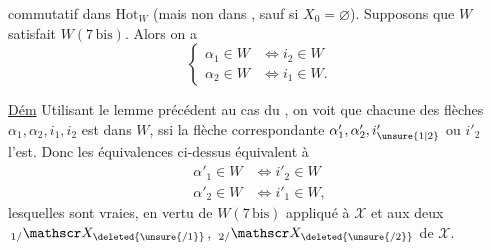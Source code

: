commutatif dans $\mathrm{Hot}_{W}$ (mais non dans , sauf si $X_0=\varnothing$). Supposons que $W$ satisfait $W(7\,\mathrm{bis})$. Alors on a
\[
\left\{\begin{aligned}
\alpha_1\in W&\Longleftrightarrow i_2\in W\\
\alpha_2\in W&\Longleftrightarrow i_1\in W .
\end{aligned}\right.
\]

 \uline{Dém} Utilisant le lemme précédent au cas du , on voit que chacune des flèches $\alpha_1,\alpha_2,i_1,i_2$ est dans $W$, ssi la flèche correspondante $\alpha'_1,\alpha'_2,i'_{\unsure{1|2}}$ ou $i'_2$ l'est. Donc les équivalences ci-dessus équivalent à
\[
\begin{aligned}
\alpha'_1\in W&\Longleftrightarrow i'_2\in W\\
\alpha'_2\in W&\Longleftrightarrow i'_1\in W ,
\end{aligned}
\]
lesquelles sont vraies, en vertu de $W(7\,\mathrm{bis})$  appliqué  à $\mathscr X$ et aux deux \uline{} $\,{}_{1/}\mathscr X_{\deleted{\unsure{/1}}}$, $\,{}_{2/}\mathscr X_{\deleted{\unsure{/2}}}$ de $\mathscr X$.

